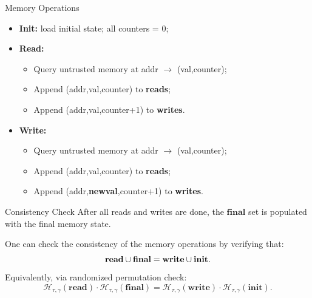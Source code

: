 \documentclass{zkdl-presentation-template}
\begin{document}
    \begin{frame}{Memory Operations}
        \begin{itemize}
            \item \textbf{Init:} load initial state; all counters = 0;\pause
            \item \textbf{Read:}
            \begin{itemize}
                \item Query untrusted memory at \textsf{addr} $\to$ \textsf{(val,counter)};
                \item Append \textsf{(addr,val,counter)} to \textbf{reads};
                \item Append \textsf{(addr,val,counter+1)} to \textbf{writes}.
            \end{itemize}
            \pause
            \item \textbf{Write:}
            \begin{itemize}
                \item Query untrusted memory at \textsf{addr} $\to$ \textsf{(val,counter)};
                \item Append \textsf{(addr,val,counter)} to \textbf{reads};
                \item Append \textsf{(addr,\textbf{newval},counter+1)} to \textbf{writes}.
            \end{itemize}
        \end{itemize}
    \end{frame}

    \begin{frame}{Consistency Check}
        After all reads and writes are done, the $\mathbf{final}$ set is populated with the final memory state.
        \pause

        \begin{lemma}
            One can check the consistency of the memory operations by verifying that:
            \begin{equation*}
                \mathbf{read} \cup \mathbf{final} = \mathbf{write} \cup \mathbf{init}.
                \vspace{-5px}
            \end{equation*}
            \pause
            Equivalently, via randomized permutation check:
            \vspace{-5px}
            \begin{equation*}
                \mathcal{H}_{\tau,\gamma}(\mathbf{read}) \cdot \mathcal{H}_{\tau,\gamma}(\mathbf{final}) =
                \mathcal{H}_{\tau,\gamma}(\mathbf{write}) \cdot \mathcal{H}_{\tau,\gamma}(\mathbf{init}).
            \end{equation*}
        \end{lemma}
    \end{frame}
\end{document}
